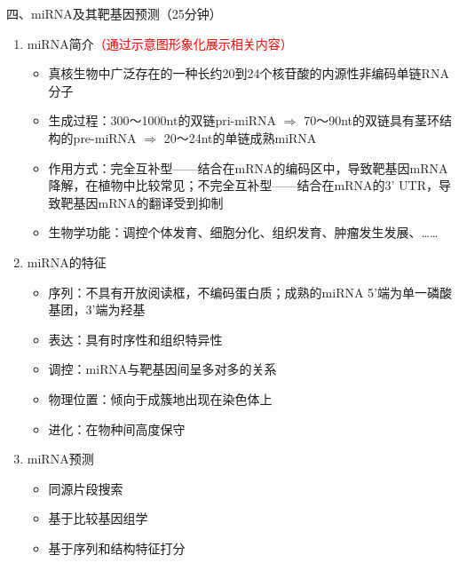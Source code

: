 \documentclass{TIJMUjiaoanLL}
\begin{document}
\noindent
四、miRNA及其靶基因预测（25分钟）
\begin{enumerate}
  \item miRNA简介\textcolor{red}{（通过示意图形象化展示相关内容）}
    \begin{itemize}
      \item 真核生物中广泛存在的一种长约20到24个核苷酸的内源性非编码单链RNA分子
      \item 生成过程：300～1000nt的双链pri-miRNA $\Rightarrow$ 70～90nt的双链具有茎环结构的pre-miRNA $\Rightarrow$ 20～24nt的单链成熟miRNA
      \item 作用方式：完全互补型——结合在mRNA的编码区中，导致靶基因mRNA降解，在植物中比较常见；不完全互补型——结合在mRNA的3' UTR，导致靶基因mRNA的翻译受到抑制
      \item 生物学功能：调控个体发育、细胞分化、组织发育、肿瘤发生发展、……
    \end{itemize}
  \item miRNA的特征
    \begin{itemize}
      \item 序列：不具有开放阅读框，不编码蛋白质；成熟的miRNA 5'端为单一磷酸基团，3'端为羟基
      \item 表达：具有时序性和组织特异性
      \item 调控：miRNA与靶基因间呈多对多的关系
      \item 物理位置：倾向于成簇地出现在染色体上
      \item 进化：在物种间高度保守
    \end{itemize}
  \item miRNA预测
    \begin{itemize}
      \item 同源片段搜索
      \item 基于比较基因组学
      \item 基于序列和结构特征打分

\end{itemize}
\end{enumerate}
\end{document}
